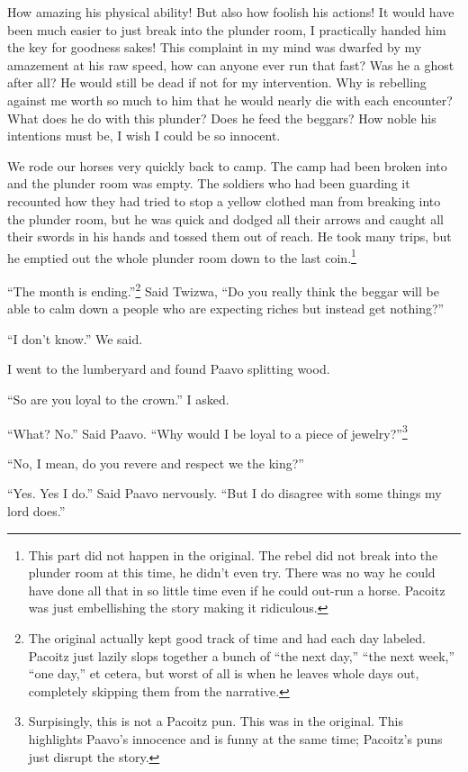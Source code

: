 How amazing his physical ability! But also how foolish his actions! It would have been much easier to just break into the plunder room, I practically handed him the key for goodness sakes! This complaint in my mind was dwarfed by my amazement at his raw speed, how can anyone ever run that fast? Was he a ghost after all? He would still be dead if not for my intervention. Why is rebelling against me worth so much to him that he would nearly die with each encounter? What does he do with this plunder? Does he feed the beggars? How noble his intentions must be, I wish I could be so innocent.

We rode our horses very quickly back to camp. The camp had been broken into and the plunder room was empty. The soldiers who had been guarding it recounted how they had tried to stop a yellow clothed man from breaking into the plunder room, but he was quick and dodged all their arrows and caught all their swords in his hands and tossed them out of reach. He took many trips, but he emptied out the whole plunder room down to the last coin.\footnote{This part did not happen in the original. The rebel did not break into the plunder room at this time, he didn't even try. There was no way he could have done all that in so little time even if he could out-run a horse. Pacoitz was just embellishing the story making it ridiculous.}

``The month is ending.''\footnote{The original actually kept good track of time and had each day labeled. Pacoitz just lazily slops together a bunch of ``the next day,'' ``the next week,'' ``one day,'' et cetera, but worst of all is when he leaves whole days out, completely skipping them from the narrative.} Said Twizwa, ``Do you really think the beggar will be able to calm down a people who are expecting riches but instead get nothing?''

``I don't know.'' We said.

\tbreak

I went to the lumberyard and found Paavo splitting wood.

``So are you loyal to the crown.'' I asked.

``What? No.'' Said Paavo. ``Why would I be loyal to a piece of jewelry?''\footnote{Surpisingly, this is not a Pacoitz pun. This was in the original. This highlights Paavo's innocence and is funny at the same time; Pacoitz's puns just disrupt the story.}

``No, I mean, do you revere and respect we the king?''

``Yes. Yes I do.'' Said Paavo nervously. ``But I do disagree with some things my lord does.''

